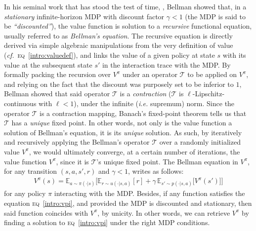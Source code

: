 In his seminal work that has stood the test of time, \cite{Bellman1957-om},
Bellman showed that, in a \emph{stationary} infinite-horizon MDP with discount factor $\gamma < 1$
(the MDP is said to be \textit{``discounted''}),
the value function is solution to a \emph{recursive} functional equation,
usually referred to as \textit{Bellman's equation}.
The recursive equation is directly derived via simple algebraic manipulations from the very definition of value
(\textit{cf.}~\textsc{eq}~\ref{intro:valuedef}),
and links the value of a given policy at state $s$ with its value at the subsequent state
$s'$ in the interaction trace with the MDP.
By formally packing the recursion over $V^\pi$ under an operator $\mathcal{T}$ to be applied on $V^\pi$,
and relying on the fact that the discount was purposely set to be inferior to $1$,
Bellman showed that said operator $\mathcal{T}$ is a \emph{contraction}
($\mathcal{T}$ is $\ell$-Lipschitz-continuous with $\ell < 1$),
under the infinite (\textit{i.e.} supremum) norm.
Since the operator $\mathcal{T}$ is a contraction mapping,
Banach's fixed-point theorem tells us that $\mathcal{T}$ has a \emph{unique} fixed point.
In other words, not only is the value function a solution of Bellman's equation,
it is its \emph{unique} solution.
As such, by iteratively and recursively applying the Bellman's operator $\mathcal{T}$
over a randomly initialized value $V^\pi$, we would ultimately converge,
at a certain number of iterations, the value function $V^\pi$, since it is $\mathcal{T}$'s unique fixed point.
The Bellman equation in $V^\pi$, for any transition $(s,a,s',r)$ and $\gamma < 1$, writes as follows:
\begin{align}
V^\pi(s)
= \mathbb{E}_{a \sim \pi(\cdot|s)}
\Big[
\mathbb{E}_{r \sim u(\cdot|s,a)}[r]
+ \gamma \,
\mathbb{E}_{s' \sim p(\cdot|s,a)}\big[V^\pi(s')\big]
\Big]
\label{intro:vpi}
\end{align}
for any policy $\pi$ interacting with the MDP.
Besides, if any function satisfies the equation \textsc{eq}~\ref{intro:vpi},
and provided the MDP is discounted and stationary,
then said function coincides with $V^\pi$, by unicity.
In other words,
we can retrieve $V^\pi$ by finding a solution to \textsc{eq}~\ref{intro:vpi}
under the right MDP conditions.

